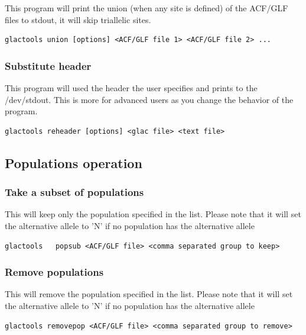 \documentclass[a4paper]{article}
\begin{document}
\noindent This program will print the union (when any site is defined) of the ACF/GLF files to stdout, it will skip triallelic sites.

\begin{lstlisting}
glactools union [options] <ACF/GLF file 1> <ACF/GLF file 2> ...
\end{lstlisting}


\subsubsection{Substitute header}
\noindent This program will used the header the user specifies and prints to the /dev/stdout. This is more for advanced users as you change the behavior of the program.

\begin{lstlisting}
glactools reheader [options] <glac file> <text file>
\end{lstlisting}



\subsection{Populations operation}

\subsubsection{Take a subset of populations}

\noindent This will keep only the population specified in the list. Please note that it will set the alternative allele to 'N' if no population has the alternative allele

\begin{lstlisting}
glactools   popsub <ACF/GLF file> <comma separated group to keep>
\end{lstlisting}

\subsubsection{Remove populations}

\noindent This will remove the population specified in the list. Please note that it will set the alternative allele to 'N' if no population has the alternative allele

\begin{lstlisting}
glactools removepop <ACF/GLF file> <comma separated group to remove>
\end{lstlisting}
\end{document}
